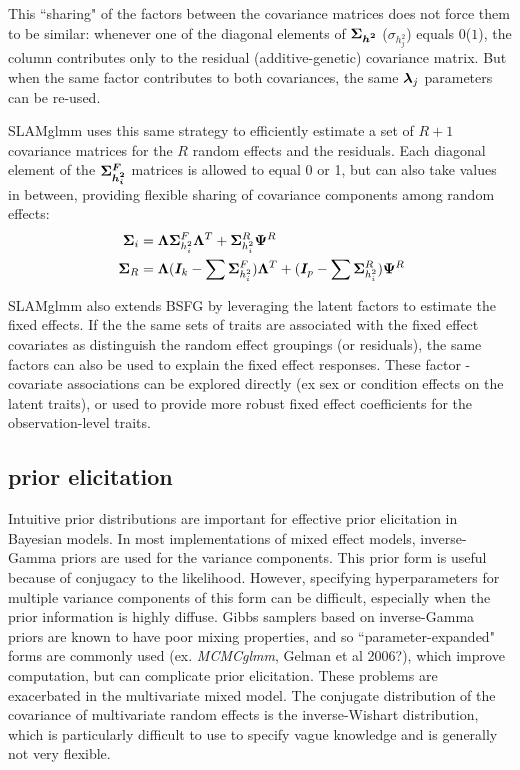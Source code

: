 \documentclass[11pt]{amsart}
\newcommand*{\B}[1]{\ifmmode\bm{#1}\else\textbf{#1}\fi}
\begin{document}
This ``sharing" of the factors between the covariance matrices does not force them to be similar: whenever one of the diagonal elements of $\B{\Sigma_{h^2}}$ ($\sigma_{h^2_j}$) equals $0$($1$), the column contributes only to the residual (additive-genetic) covariance matrix. But when the same factor contributes to both covariances, the same $\B{\lambda}_j$ parameters can be re-used.

SLAMglmm uses this same strategy to efficiently estimate a set of $R+1$ covariance matrices for the $R$ random effects and the residuals. Each diagonal element of the $\B{\Sigma^F_{h^2_i}}$ matrices is allowed to equal 0 or 1, but can also take values in between, providing flexible sharing of covariance components among random effects:
\begin{align}\begin{split}
\;\B{\Sigma}_i &= \B{\Lambda} \B{\Sigma}^F_{h^2_i} \B{\Lambda}^T + \B{\Sigma}^R_{h^2_i}\B{\Psi}^R \\
\;\B{\Sigma}_R &= \B{\Lambda} (\B{I}_k - \sum \B{\Sigma}^F_{h^2_i}) \B{\Lambda}^T + (\B{I}_p - \sum \B{\Sigma}^R_{h^2_i})\B{\Psi}^R 
\end{split} \end{align}

SLAMglmm also extends BSFG by leveraging the latent factors to estimate the fixed effects. If the the same sets of traits are associated with the fixed effect covariates as distinguish the random effect groupings (or residuals), the same factors can also be used to explain the fixed effect responses. These factor - covariate associations can be explored directly (ex sex or condition effects on the latent traits), or used to provide more robust fixed effect coefficients for the observation-level traits.

\subsection{prior elicitation}
\label{random_effect_priors}
Intuitive prior distributions are important for effective prior elicitation in Bayesian models. In most implementations of mixed effect models, inverse-Gamma priors are used for the variance components. This prior form is useful because of conjugacy to the likelihood. However, specifying hyperparameters for multiple variance components of this form can be difficult, especially when the prior information is highly diffuse. Gibbs samplers based on inverse-Gamma priors are known to have poor mixing properties, and so ``parameter-expanded" forms are commonly used (ex. \emph{MCMCglmm}, Gelman et al 2006?), which improve computation, but can complicate prior elicitation. These problems are exacerbated in the multivariate mixed model. The conjugate distribution of the covariance of multivariate random effects is the inverse-Wishart distribution, which is particularly difficult to use to specify vague knowledge and is generally not very flexible.
\end{document}
